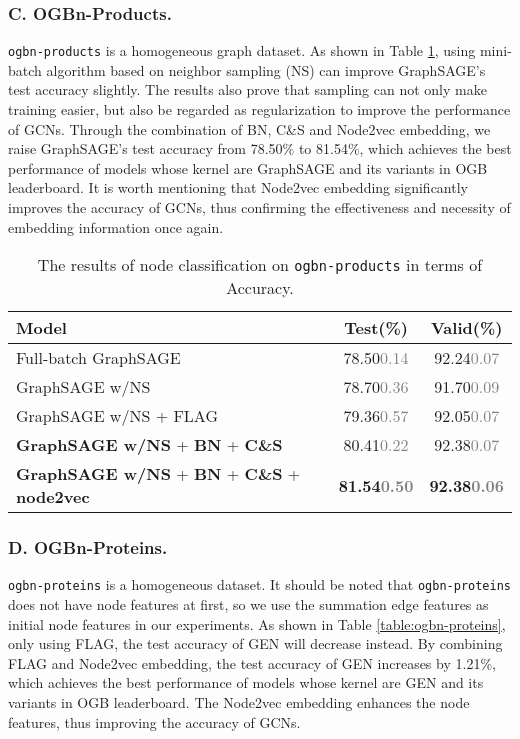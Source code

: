 \documentclass[runningheads]{llncs}
\newcommand{\std}[1]{\textcolor{gray}{\scriptsize{#1}}}
\begin{document}
\subsubsection{C. OGBn-Products.}
\texttt{ogbn-products} is a homogeneous graph dataset. As shown in
Table \ref{table:ogbn-products}, using mini-batch algorithm based on neighbor sampling (NS) can
improve GraphSAGE's test accuracy slightly. The results also prove that sampling can
not only make training easier, but also be regarded as regularization
to improve the performance of GCNs. 
Through the combination of BN, C\&S and Node2vec embedding, we raise GraphSAGE's test accuracy from 78.50\% to 81.54\%, which achieves the best performance of models whose kernel are GraphSAGE and its variants in OGB leaderboard. It is worth mentioning that Node2vec
embedding significantly improves the accuracy of GCNs, thus confirming the effectiveness and necessity of embedding
information once again.

\begin{table}[htbp] 
\caption{The results of node classification on \texttt{ogbn-products} in terms of Accuracy. }
\label{table:ogbn-products}
\begin{center}
\renewcommand\tabcolsep{5.0pt}
\begin{tabular}{l|c|c}
\hline
\textbf{Model}  & \textbf{Test(\%)} & \textbf{Valid(\%)}  \\
\hline
\hline
Full-batch GraphSAGE \cite{hamilton2017inductive}& 78.50\std{0.14} & 92.24\std{0.07} \\
GraphSAGE w/NS & 78.70\std{0.36} & 91.70\std{0.09} \\
GraphSAGE w/NS + FLAG & 79.36\std{0.57} & 92.05\std{0.07} \\
\hline
\hline
\textbf{GraphSAGE w/NS} + \textbf{BN} + \textbf{C\&S} & 80.41\std{0.22} & 92.38\std{0.07} \\
\textbf{GraphSAGE w/NS} + \textbf{BN} + \textbf{C\&S} + \textbf{node2vec} & \textbf{81.54\std{0.50}} &
\textbf{92.38\std{0.06}} \\
\hline
\end{tabular}
\end{center} 
\end{table}




\subsubsection{D. OGBn-Proteins.}
\texttt{ogbn-proteins} is a homogeneous dataset. It
should be noted that \texttt{ogbn-proteins} does not have node features at first, so we use the summation edge features as initial node features in our experiments.
As shown in Table \ref{table:ogbn-proteins}, only using FLAG, the
test accuracy of GEN \cite{li2020deepergcn,li2019deepgcns} will decrease instead. By combining FLAG and Node2vec embedding, the test accuracy of
GEN increases by 1.21\%, which achieves the best performance of models whose kernel are GEN and its variants in OGB leaderboard. The Node2vec embedding enhances the node features,
thus improving the accuracy of GCNs.
\end{document}

